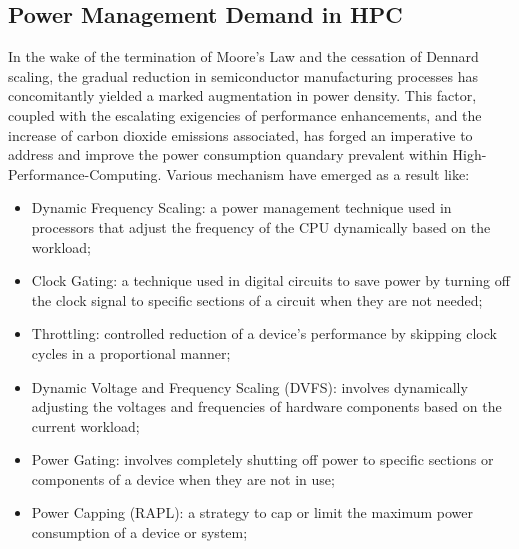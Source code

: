 \subsection{Power Management Demand in HPC}
In the wake of the termination of Moore's Law and the cessation of Dennard scaling, the gradual reduction in semiconductor manufacturing processes has concomitantly yielded a marked augmentation in power density\cite{MOSFET-Scaling}. This factor, coupled with the escalating exigencies of performance enhancements, and the increase of carbon dioxide emissions associated, has forged an imperative to address and improve the power consumption quandary prevalent within High-Performance-Computing.
Various mechanism have emerged as a result like: 
\begin{itemize}

    \item Dynamic Frequency Scaling: a power management technique used in processors that adjust the frequency of the CPU dynamically based on the workload;
    \item Clock Gating: a technique used in digital circuits to save power by turning off the clock signal to specific sections of a circuit when they are not needed;
    \item Throttling: controlled reduction of a device's performance by skipping clock cycles in a proportional manner;
    \item Dynamic Voltage and Frequency Scaling\cite{DVFS} (DVFS): involves dynamically adjusting the voltages and frequencies of hardware components based on the current workload; 
    \item Power Gating: involves completely shutting off power to specific sections or components of a device when they are not in use;
    \item Power Capping (RAPL): a strategy to cap or limit the maximum power consumption of a device or system;

\end{itemize}

